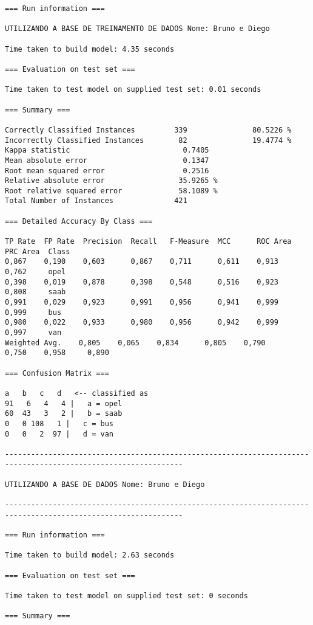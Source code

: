 \documentclass[
	article,			%
	11pt,				%
	oneside,			%
	a4paper,			%
	english,			%
	brazil,				%
	sumario=tradicional
	]{abntex2}
\begin{document}
\begin{lstlisting}
=== Run information ===

UTILIZANDO A BASE DE TREINAMENTO DE DADOS Nome: Bruno e Diego

Time taken to build model: 4.35 seconds

=== Evaluation on test set ===

Time taken to test model on supplied test set: 0.01 seconds

=== Summary ===

Correctly Classified Instances         339               80.5226 %
Incorrectly Classified Instances        82               19.4774 %
Kappa statistic                          0.7405
Mean absolute error                      0.1347
Root mean squared error                  0.2516
Relative absolute error                 35.9265 %
Root relative squared error             58.1089 %
Total Number of Instances              421     

=== Detailed Accuracy By Class ===

TP Rate  FP Rate  Precision  Recall   F-Measure  MCC      ROC Area  PRC Area  Class
0,867    0,190    0,603      0,867    0,711      0,611    0,913     0,762     opel
0,398    0,019    0,878      0,398    0,548      0,516    0,923     0,808     saab
0,991    0,029    0,923      0,991    0,956      0,941    0,999     0,999     bus
0,980    0,022    0,933      0,980    0,956      0,942    0,999     0,997     van
Weighted Avg.    0,805    0,065    0,834      0,805    0,790      0,750    0,958     0,890     

=== Confusion Matrix ===

a   b   c   d   <-- classified as
91   6   4   4 |   a = opel
60  43   3   2 |   b = saab
0   0 108   1 |   c = bus
0   0   2  97 |   d = van

---------------------------------------------------------------------------------------------------------------

UTILIZANDO A BASE DE DADOS Nome: Bruno e Diego

---------------------------------------------------------------------------------------------------------------

=== Run information ===

Time taken to build model: 2.63 seconds

=== Evaluation on test set ===

Time taken to test model on supplied test set: 0 seconds

=== Summary ===


\end{lstlisting}
\end{document}
